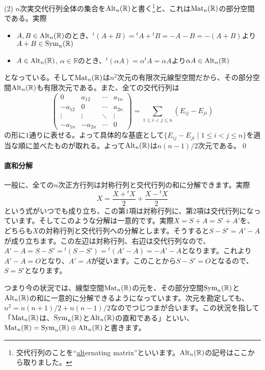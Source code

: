 \noindent (2) $n$次実交代行列全体の集合を$\operatorname{Alt}_n(\mathbb{R})$と書く\footnote{交代行列のことを``\uline{alt}ernating matrix''といいます。$\operatorname{Alt}_n(\mathbb{R})$の記号はここから取りました。}と、これは$\operatorname{Mat}_n(\mathbb{R})$の部分空間である。実際
\begin{itemize}
\item $A, B \in \operatorname{Alt}_n(\mathbb{R})$のとき、${}^t(A + B) = {}^t A + {}^t B = - A - B = -(A + B)$より$A + B \in \operatorname{Sym}_n(\mathbb{R})$
\item $A \in \operatorname{Alt}_n(\mathbb{R})$, $\alpha \in \mathbb{R}$のとき、${}^t(\alpha A) = \alpha {}^t A = \alpha A$より$\alpha A\in\operatorname{Alt}_n(\mathbb{R})$
\end{itemize}
となっている。そして$\operatorname{Mat}_n(\mathbb{R})$は$n^2$次元の有限次元線型空間だから、その部分空間$\operatorname{Alt}_n(\mathbb{R})$も有限次元である。また、全ての交代行列は
\[
\begin{pmatrix}
0 & a_{12} & \cdots & a_{1n} \\
-a_{12} & 0 & \cdots & a_{2n} \\
\vdots & \vdots & \ddots & \vdots \\
-a_{1n} & -a_{2n} & \cdots & 0
\end{pmatrix}
=
\sum_{1\leq i < j \leq n}(E_{ij} - E_{ji})
\]
の形に$1$通りに表せる。よって具体的な基底として$\{E_{ij} - E_{ji} \mid 1 \leq i < j \leq n \}$を適当な順に並べたものが取れる。よって$\operatorname{Alt}_n(\mathbb{R})$は$n(n - 1)/2$次元である。\qed

\paragraph{直和分解}
一般に、全ての$n$次正方行列は対称行列と交代行列の和に分解できます。実際
\[
X = \frac{X + {}^t X}{2} + \frac{X - {}^t X}{2}
\]
という式がいつでも成り立ち、この第$1$項は対称行列に、第$2$項は交代行列になっています。そしてこのような分解は一意的です。実際$X = S + A = S' + A'$を、どちらも$X$の対称行列と交代行列への分解とします。そうすると$S - S' = A' - A$が成り立ちます。この左辺は対称行列、右辺は交代行列なので、$A' - A = S - S' = {}^t(S - S') = {}^t(A' - A) = -A' - A$となります。これより$A' - A = O$となり、$A' = A$が従います。このことから$S - S' = O$となるので、$S = S'$となります。

つまり今の状況では、線型空間$\operatorname{Mat}_n(\mathbb{R})$の元を、その部分空間$\operatorname{Sym}_n(\mathbb{R})$と$\operatorname{Alt}_n(\mathbb{R})$の和に一意的に分解できるようになっています。次元を勘定しても、$n^2 = n(n + 1)/2 + n(n - 1)/2$なのでつじつまが合います。この状況を指して「$\operatorname{Mat}_n(\mathbb{R})$は、$\operatorname{Sym}_n(\mathbb{R})$と$\operatorname{Alt}_n(\mathbb{R})$の直和である」といい、$\operatorname{Mat}_n(\mathbb{R}) = \operatorname{Sym}_n(\mathbb{R}) \oplus \operatorname{Alt}_n(\mathbb{R})$と書きます。

